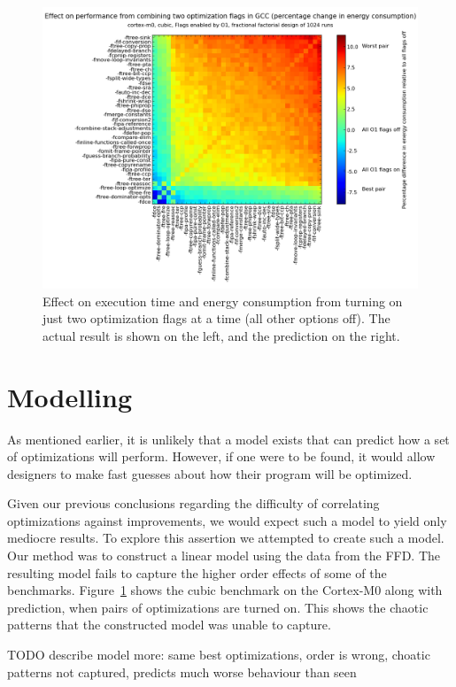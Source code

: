 \documentclass[twocolumn]{article}
\let\oldcaption\caption
\renewcommand{\caption}[1]{\oldcaption{\textup{#1}}}
\begin{document}
\begin{figure}
\begin{minipage}[r]{0.95\columnwidth}
        \centering
		\includegraphics[width=0.9\linewidth, clip, trim= 8.8cm 0 7cm 2cm]{cortex-m0/o1cub_-7p5_10_pred.png}
    \end{minipage}
    \caption{Effect on execution time and energy consumption from turning on just two optimization flags at a time (all other options off). The actual result is shown on the left, and the prediction on the right.}
    \label{Fig:twoway_cubic}
\end{figure}


\section{Modelling}

As mentioned earlier, it is unlikely that a model exists that can predict how a set of optimizations will perform. However, if one were to be found, it would allow designers to make fast guesses about how their program will be optimized.

Given our previous conclusions regarding the difficulty of correlating optimizations against improvements, we would expect such a model to yield only mediocre results. To explore this assertion we attempted to create such a model. Our method was to construct a linear model using the data from the FFD. The resulting model fails to capture the higher order effects of some of the benchmarks. Figure~\ref{Fig:twoway_cubic} shows the cubic benchmark on the Cortex-M0 along with prediction, when pairs of optimizations are turned on. This shows the chaotic patterns that the constructed model was unable to capture.

TODO describe model more: same best optimizations, order is wrong, choatic patterns not captured, predicts much worse behaviour than seen
\end{document}
